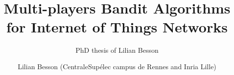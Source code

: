 \documentclass[a4paper,12pt,twoside,index,PageStyleII,print]{0-Misc/PhDThesisPSnPDF}
\title{Multi-players Bandit Algorithms for Internet of Things Networks}
\subtitle{PhD thesis of Lilian Besson}
\author{Lilian Besson (CentraleSupélec campus de Rennes and Inria Lille)}
\begin{document}
	\frontmatter
	

		\begin{spacing}{1}
			\dominitoc
			\tableofcontents
		\end{spacing}

	\mainmatter

	


\end{document}
